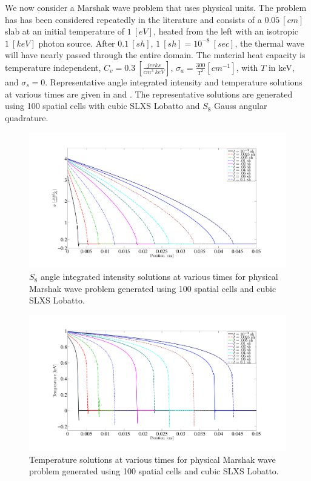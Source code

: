 We now consider a Marshak wave problem that uses physical units.
The problem has has been considered repeatedly in the literature \cite{negative_trt,time_adaptive_diffusion,physical_marshak} and consists of a $0.05~[cm]$ slab at an initial temperature of $1~[eV]$, heated from the left with an isotropic $1~[keV]$ photon source.
After $0.1~[sh]$, $1~[sh]=10^{-8}~[sec]$, the thermal wave will have nearly passed through the entire domain.
The material heat capacity is temperature independent, $C_v = 0.3~[\frac{jerks}{cm^3~keV}]$, $\sigma_a = \frac{300}{T^3} [cm^{-1}]$, with $T$ in keV, and $\sigma_s = 0$.
Representative angle integrated intensity and temperature solutions at various times are given in  and .    
The representative solutions are generated using 100 spatial cells with cubic SLXS Lobatto and $S_8$ Gauss angular quadrature.
\begin{figure}[!hbp]
\centering
\includegraphics[width=16cm,trim=1.5in  0.4in 0.5in 0.75in,clip=true]{chapter6_grey_radtran/Dissertation_Data/100C_Physical_Marshak_Wave_Radiation_Times.pdf}
\caption{$S_{8}$ angle integrated intensity solutions at various times for physical Marshak wave problem generated using 100 spatial cells and cubic SLXS Lobatto.}
\label{fig:physical_slices_radiation}
\end{figure}
\begin{figure}[!htp]
\centering
\includegraphics[width=16cm,trim=1.5in  0.4in 0.5in 0.75in,clip=true]{chapter6_grey_radtran/Dissertation_Data/100C_Physical_Marshak_Wave_Temperature_Times.pdf}
\caption{Temperature solutions at various times for physical Marshak wave problem generated using 100 spatial cells and cubic SLXS Lobatto.}
\label{fig:physical_slices_temperature}
\end{figure}
